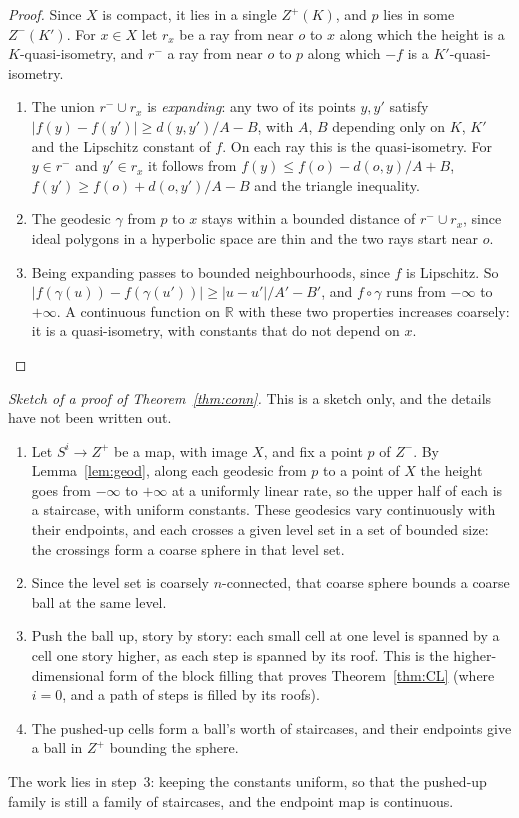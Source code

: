\documentclass[11pt]{article}
\theoremstyle{remark}
\newcommand{\R}{\mathbb{R}}
\begin{document}
\begin{proof}
Since $X$ is compact, it lies in a single $Z^+(K)$, and $p$ lies in some $Z^-(K')$. For $x\in X$ let $r_x$ be a ray from
near $o$ to $x$ along which the height is a $K$-quasi-isometry, and $r^-$ a ray from near $o$ to $p$ along which $-f$ is a
$K'$-quasi-isometry.
\begin{enumerate}
\item The union $r^-\cup r_x$ is \emph{expanding}: any two of its points $y,y'$ satisfy $|f(y)-f(y')|\ge d(y,y')/A-B$,
with $A$, $B$ depending only on $K$, $K'$ and the Lipschitz constant of $f$. On each ray this is the quasi-isometry. For
$y\in r^-$ and $y'\in r_x$ it follows from $f(y)\le f(o)-d(o,y)/A+B$, $f(y')\ge f(o)+d(o,y')/A-B$ and the triangle
inequality.
\item The geodesic $\gamma$ from $p$ to $x$ stays within a bounded distance of $r^-\cup r_x$, since ideal polygons in a
hyperbolic space are thin and the two rays start near $o$.
\item Being expanding passes to bounded neighbourhoods, since $f$ is Lipschitz. So $|f(\gamma(u))-f(\gamma(u'))|\ge
|u-u'|/A'-B'$, and $f\circ\gamma$ runs from $-\infty$ to $+\infty$. A continuous function on $\R$ with these two properties
increases coarsely: it is a quasi-isometry, with constants that do not depend on $x$.\qedhere
\end{enumerate}
\end{proof}

\noindent\emph{Sketch of a proof of Theorem~\ref{thm:conn}.} This is a sketch only, and the details have not been written out.
\begin{enumerate}
\item Let $S^i\to Z^+$ be a map, with image $X$, and fix a point $p$ of $Z^-$. By Lemma~\ref{lem:geod}, along each geodesic from $p$
to a point of $X$ the height goes from $-\infty$ to $+\infty$ at a uniformly linear rate, so the upper half of each is a
staircase, with uniform constants. These geodesics vary continuously with their endpoints, and each crosses a given
level set in a set of bounded size: the crossings form a coarse sphere in that level set.
\item Since the level set is coarsely $n$-connected, that coarse sphere bounds a coarse ball at the same level.
\item Push the ball up, story by story: each small cell at one level is spanned by a cell one story higher, as each step is
spanned by its roof. This is the higher-dimensional form of the block filling that proves Theorem~\ref{thm:CL} (where $i=0$, and a
path of steps is filled by its roofs).
\item The pushed-up cells form a ball's worth of staircases, and their endpoints give a ball in $Z^+$ bounding the
sphere.
\end{enumerate}
The work lies in step~3: keeping the constants uniform, so that the pushed-up family is still a family of staircases, and
the endpoint map is continuous.
\end{document}
